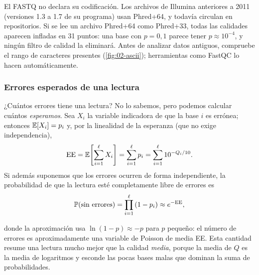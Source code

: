 \begin{cuidado}
El FASTQ no declara su codificación. Los archivos de Illumina anteriores a 2011 (versiones 1.3 a 1.7 de su programa) usan Phred+64, y todavía circulan en repositorios. Si se lee un archivo Phred+64 como Phred+33, todas las calidades aparecen infladas en 31 puntos: una base con $p=0{,}1$ parece tener $p\approx 10^{-4}$, y ningún filtro de calidad la eliminará. Antes de analizar datos antiguos, compruebe el rango de caracteres presentes (\cref{fig:02-ascii}); herramientas como FastQC lo hacen automáticamente.
\end{cuidado}

\subsubsection{Errores esperados de una lectura}

¿Cuántos errores tiene una lectura? No lo sabemos, pero podemos calcular cuántos \emph{esperamos}. Sea $X_i$ la variable indicadora de que la base $i$ es errónea; entonces $\mathbb{E}[X_i]=p_i$ y, por la linealidad de la esperanza (que no exige independencia),
\begin{equation}\label{eq:02-ee}
\mathrm{EE} = \mathbb{E}\!\left[\sum_{i=1}^{\ell} X_i\right] = \sum_{i=1}^{\ell} p_i = \sum_{i=1}^{\ell} 10^{-Q_i/10}.
\end{equation}
Si además suponemos que los errores ocurren de forma independiente, la probabilidad de que la lectura esté completamente libre de errores es
\begin{equation}\label{eq:02-p0}
\mathbb{P}(\text{sin errores}) = \prod_{i=1}^{\ell}\left(1-p_i\right) \approx e^{-\mathrm{EE}},
\end{equation}
\begin{simbolos}
\end{simbolos}
donde la aproximación usa $\ln(1-p)\approx -p$ para $p$ pequeño: el número de errores es aproximadamente una variable de Poisson de media EE. Esta cantidad resume una lectura mucho mejor que la calidad \emph{media}, porque la media de $Q$ es la media de logaritmos y esconde las pocas bases malas que dominan la suma de probabilidades.

